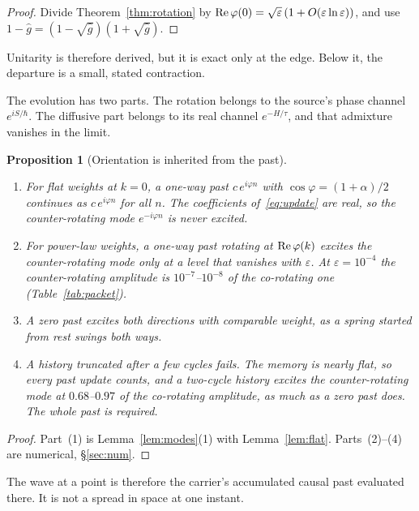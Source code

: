 \documentclass[11pt]{amsart}
\newtheorem{proposition}[theorem]{Proposition}
\theoremstyle{definition}
\theoremstyle{remark}
\newcommand{\eps}{\varepsilon}
\begin{document}
\begin{proof}
Divide Theorem~\ref{thm:rotation} by ${\rm Re}\,\varphi(0)=\sqrt\eps\,(1+O(\eps\ln\eps))$, and use $1-\hat g=(1-\sqrt{\hat g})(1+\sqrt{\hat g})$. \end{proof}

Unitarity is therefore derived, but it is exact only at the edge. Below it, the departure is a small, stated contraction.

The evolution has two parts. The rotation belongs to the source's phase channel $e^{iS/\hbar}$. The diffusive part belongs to its real channel $e^{-H/\tau}$, and that admixture vanishes in the limit.

\begin{proposition}[Orientation is inherited from the past]\label{prop:orientation}
\begin{enumerate}
\item For flat weights at $k=0$, a one-way past $c\,e^{i\varphi n}$ with $\cos\varphi=(1+\alpha)/2$ continues as $c\,e^{i\varphi n}$ for all $n$. The coefficients of~\eqref{eq:update} are real, so the counter-rotating mode $e^{-i\varphi n}$ is never excited.
\item For power-law weights, a one-way past rotating at ${\rm Re}\,\varphi(k)$ excites the counter-rotating mode only at a level that vanishes with $\eps$. At $\eps=10^{-4}$ the counter-rotating amplitude is $10^{-7}$--$10^{-8}$ of the co-rotating one (Table~\ref{tab:packet}).
\item A zero past excites both directions with comparable weight, as a spring started from rest swings both ways.
\item A history truncated after a few cycles fails. The memory is nearly flat, so every past update counts, and a two-cycle history excites the counter-rotating mode at $0.68$--$0.97$ of the co-rotating amplitude, as much as a zero past does. The whole past is required.
\end{enumerate}
\end{proposition}

\begin{proof}
Part~(1) is Lemma~\ref{lem:modes}(1) with Lemma~\ref{lem:flat}. Parts~(2)--(4) are numerical, \S\ref{sec:num}. \end{proof}

The wave at a point is therefore the carrier's accumulated causal past evaluated there. It is not a spread in space at one instant.
\end{document}

